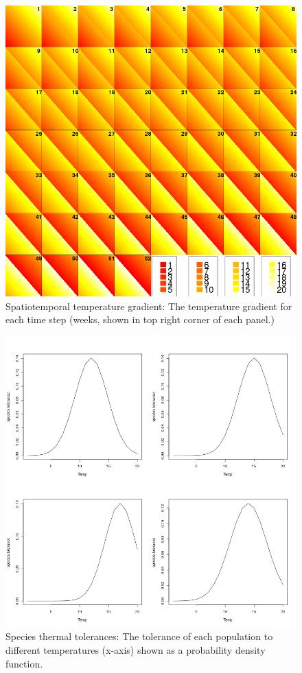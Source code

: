 \documentclass[review]{elsarticle}
\begin{document}
\begin{figure}[!ht]
	\includegraphics[width = \linewidth]{Plots/Temperature_gradient}
	\caption{Spatiotemporal temperature gradient: The temperature gradient
	for each time step (weeks, shown in top right corner of each panel.)}
	\label{fig:3}
\end{figure}

\begin{figure}[!ht]
	\includegraphics[width = \linewidth]{Plots/Species_tolerances}
	\caption{Species thermal tolerances: The tolerance of each population
		to different temperatures (x-axis) shown as a probability
		density function.}
	\label{fig:4}
\end{figure}
\end{document}
